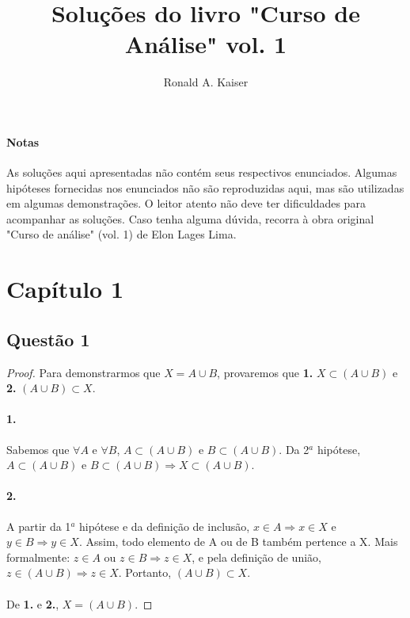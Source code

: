 \documentclass[9pt,twocolumn,a4paper]{article}
\title{Soluções do livro "Curso de Análise" vol. 1}
\author{Ronald A. Kaiser}
\begin{document}
    \maketitle
    \newpage
    
    \paragraph{Notas}
    As soluções aqui apresentadas não contém seus respectivos enunciados. Algumas hipóteses fornecidas nos enunciados não são reproduzidas aqui, mas são utilizadas em algumas demonstrações. O leitor atento não deve ter dificuldades para acompanhar as soluções. Caso tenha alguma dúvida, recorra à obra original "Curso de análise" (vol. 1) de Elon Lages Lima.

    \section{Capítulo 1}

    \subsection{Questão 1}
    \begin{proof}
    Para demonstrarmos que $X = A \cup B$, provaremos que \textbf{1.} $X \subset (A \cup B)$ e \textbf{2.} $(A \cup B) \subset X$.

    \paragraph{1.}
    Sabemos que $\forall A$ e $\forall B$, $A \subset (A \cup B)$ e $B \subset (A \cup B)$. 
    Da 2$^a$ hipótese, $A \subset (A \cup B)$ e $B \subset (A \cup B) \Rightarrow X \subset (A \cup B)$.

    \paragraph{2.}
    A partir da 1$^a$ hipótese e da definição de inclusão, $x \in A \Rightarrow x \in X$ e $y \in B \Rightarrow y \in X$. Assim, todo elemento de A ou de B também pertence a X. Mais formalmente: $z \in A$ ou $z \in B \Rightarrow z \in X$, e  pela definição de união, $z \in (A \cup B) \Rightarrow z \in X$. Portanto, $(A \cup B) \subset X$.

    \paragraph{}
    De \textbf{1.} e \textbf{2.}, $X = (A \cup B)$.
    \end{proof}
\end{document}
